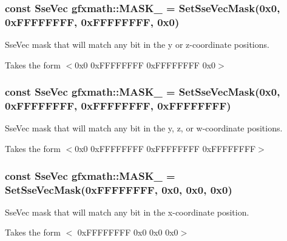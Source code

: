 \subsubsection[{M\+A\+S\+K\+\_\+0110}]{\setlength{\rightskip}{0pt plus 5cm}const {\bf Sse\+Vec} gfxmath\+::\+M\+A\+S\+K\+\_ = {\bf Set\+Sse\+Vec\+Mask}(0x0, 0x\+F\+F\+F\+F\+F\+F\+F\+F, 0x\+F\+F\+F\+F\+F\+F\+F\+F, 0x0)}\label{namespacegfxmath_a0a4b2297562ec2a6515260a20caca407}


Sse\+Vec mask that will match any bit in the y or z-\/coordinate positions. 

Takes the form $<$0x0 0x\+F\+F\+F\+F\+F\+F\+F\+F 0x\+F\+F\+F\+F\+F\+F\+F\+F 0x0$>$ \hypertarget{namespacegfxmath_af0b3d0d404066d8571a0a5b3ac58c76d}{}
\subsubsection[{M\+A\+S\+K\+\_\+0111}]{\setlength{\rightskip}{0pt plus 5cm}const {\bf Sse\+Vec} gfxmath\+::\+M\+A\+S\+K\+\_ = {\bf Set\+Sse\+Vec\+Mask}(0x0, 0x\+F\+F\+F\+F\+F\+F\+F\+F, 0x\+F\+F\+F\+F\+F\+F\+F\+F, 0x\+F\+F\+F\+F\+F\+F\+F\+F)}\label{namespacegfxmath_af0b3d0d404066d8571a0a5b3ac58c76d}


Sse\+Vec mask that will match any bit in the y, z, or w-\/coordinate positions. 

Takes the form $<$0x0 0x\+F\+F\+F\+F\+F\+F\+F\+F 0x\+F\+F\+F\+F\+F\+F\+F\+F 0x\+F\+F\+F\+F\+F\+F\+F\+F$>$ \hypertarget{namespacegfxmath_a10283405fa4ee9c652e68cd952034937}{}
\subsubsection[{M\+A\+S\+K\+\_\+1000}]{\setlength{\rightskip}{0pt plus 5cm}const {\bf Sse\+Vec} gfxmath\+::\+M\+A\+S\+K\+\_ = {\bf Set\+Sse\+Vec\+Mask}(0x\+F\+F\+F\+F\+F\+F\+F\+F, 0x0, 0x0, 0x0)}\label{namespacegfxmath_a10283405fa4ee9c652e68cd952034937}


Sse\+Vec mask that will match any bit in the x-\/coordinate position. 

Takes the form $<$ 0x\+F\+F\+F\+F\+F\+F\+F\+F 0x0 0x0 0x0$>$ \hypertarget{namespacegfxmath_a614228347cb24ffbda356c24735c1b3b}{}
